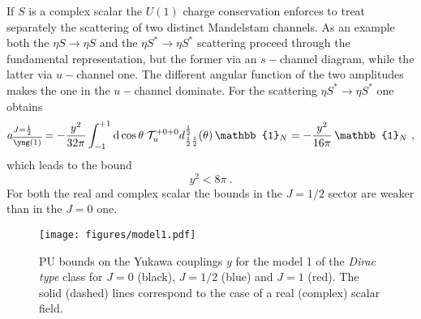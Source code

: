 \documentclass[a4paper,11pt]{article}
\newcommand{\be}{\begin{equation}}
\newcommand{\ee}{\end{equation}}
\begin{document}
If $S$ is a complex scalar  the $U(1)$ charge conservation enforces to treat separately the scattering of two distinct Mandelstam channels. As an example both the $\eta S \to \eta S$  and the $\eta S^* \to \eta S^*$ scattering proceed through the fundamental representation, but the former via an  $s-$channel diagram, while the latter via  $u-$channel one. The different angular function of the two amplitudes makes the one in the $u-$channel dominate.  For the scattering $\eta S^* \to \eta S^*$ one obtains
\be\label{eq:model1_j12_complex}
a^{J=\frac{1}{2}}_{{\overline{{\tiny{\yng(1)}}}}} =
-\frac{y^2}{32\pi}
 \int_{-1}^{+1}{\rm d}\cos\theta \;
{\cal T}_u^{+0+0}
d^\frac{1}{2}_{\frac{1}{2}\frac{1}{2}}(\theta)
\, {\mathbb{1}}_N  = -  \frac{y^2}{16\pi} \, {\mathbb{1}}_N  \ ,
\ee
which leads to the bound
\be
y^2 < 8 \pi \ .
\ee
For both the real and complex scalar the bounds in the $J=1/2$ sector are weaker than in the $J=0$ one.

\begin{figure}[t!]
\begin{center}
\texttt{[image: figures/model1.pdf]}
\caption{\small PU bounds on the Yukawa couplings $y$ for the model 1 of the {\emph{Dirac type}} class
for $J=0$ (black), $J=1/2$ (blue) and $J=1$ (red).
The solid (dashed) lines correspond to the case of a real (complex) scalar field. }
\label{fig:model1}
\end{center}
\end{figure}
\end{document}
